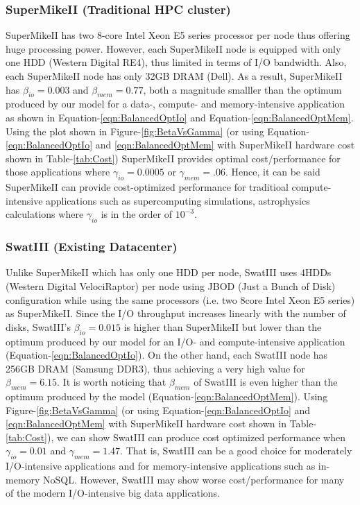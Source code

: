 \documentclass[journal]{IEEEtran}
\begin{document}
\subsubsection{SuperMikeII (Traditional HPC cluster)}
SuperMikeII has two 8-core Intel Xeon E5 series processor per node thus offering huge processing power. However, each SuperMikeII node is equipped with only one HDD (Western Digital RE4), thus limited in terms of I/O bandwidth. Also, each SuperMikeII node has only 32GB DRAM (Dell). As a result, SuperMikeII has $\beta_{io}=0.003$ and $\beta_{mem}=0.77$, both a magnitude smalller than the optimum produced by our model for a data-, compute- and memory-intensive application as shown in Equation-\ref{eqn:BalancedOptIo} and Equation-\ref{eqn:BalancedOptMem}. Using the plot shown in Figure-\ref{fig:BetaVsGamma} (or using Equation-\ref{eqn:BalancedOptIo} and \ref{eqn:BalancedOptMem} with SuperMikeII hardware cost shown in Table-\ref{tab:Cost}) SuperMikeII provides optimal cost/performance for those applications where $\gamma_{io}=0.0005$ or $\gamma_{mem}=.06$. Hence, it can be said SuperMikeII can provide cost-optimized performance for traditioal compute-intensive applications  such as supercomputing simulations, astrophysics calculations where $\gamma_{io}$ is in the order of $10^{-3}$.  
\subsubsection{SwatIII (Existing Datacenter)}
Unlike SuperMikeII which has only one HDD per node, SwatIII uses 4HDDs (Western Digital VelociRaptor) per node using JBOD (Just a Bunch of Disk) configuration while using the same processors (i.e. two 8core Intel Xeon E5 series) as SuperMikeII. Since the I/O throughput increases linearly with the number of disks, SwatIII's $\beta_{io}=0.015$ is higher than SuperMikeII but lower than the optimum produced by our model for an I/O- and compute-intensive application (Equation-\ref{eqn:BalancedOptIo}). On the other hand, each SwatIII node has 256GB DRAM (Samsung DDR3), thus achieving a very high value for $\beta_{mem}=6.15$. It is worth noticing that $\beta_{mem}$ of SwatIII is even higher than the optimum produced by the model (Equation-\ref{eqn:BalancedOptMem}). Using Figure-\ref{fig:BetaVsGamma} (or using Equation-\ref{eqn:BalancedOptIo} and \ref{eqn:BalancedOptMem} with SuperMikeII hardware cost shown in Table-\ref{tab:Cost}), we can show SwatIII can produce cost optimized performance when $\gamma_{io} = 0.01$ and $\gamma_{mem}=1.47$. That is, SwatIII can be a good choice for moderately I/O-intensive applications and for memory-intensive applications such as in-memory NoSQL. However, SwatIII may show worse cost/performance for many of the modern I/O-intensive big data applications. 
\end{document}
